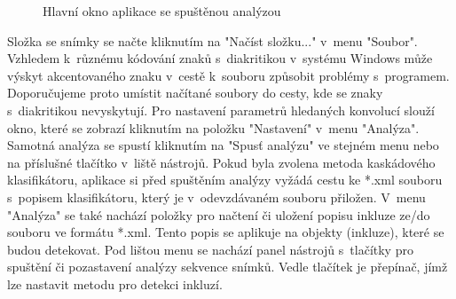 \documentclass[12pt, a4paper]{report}
\begin{document}
	\begin{figure}[!htb]
	\centering
	\label{fig:hlavni_okno}
	\caption{Hlavní okno aplikace se spuštěnou analýzou}
	\end{figure}

Složka se snímky se načte kliknutím na "Načíst složku..." v~menu "Soubor". Vzhledem k~různému kódování znaků s~diakritikou v~systému Windows může výskyt akcentovaného znaku v~cestě k~souboru způsobit problémy s~programem. Doporučujeme proto umístit načítané soubory do cesty, kde se znaky s~diakritikou nevyskytují. Pro nastavení parametrů hledaných konvolucí slouží okno, které se zobrazí kliknutím na položku "Nastavení" v~menu "Analýza". Samotná analýza se spustí kliknutím na "Spusť analýzu" ve stejném menu nebo na příslušné tlačítko v~liště nástrojů. Pokud byla zvolena metoda kaskádového klasifikátoru, aplikace si před spuštěním analýzy vyžádá cestu ke *.xml souboru s~popisem klasifikátoru, který je v~odevzdávaném souboru přiložen. V~menu "Analýza" se také nachází položky pro načtení či uložení popisu inkluze ze/do souboru ve formátu *.xml. Tento popis se aplikuje na objekty (inkluze), které se budou detekovat. Pod lištou menu se nachází panel nástrojů s~tlačítky pro spuštění či pozastavení analýzy sekvence snímků. Vedle tlačítek je přepínač, jímž lze nastavit metodu pro detekci inkluzí.
\end{document}
